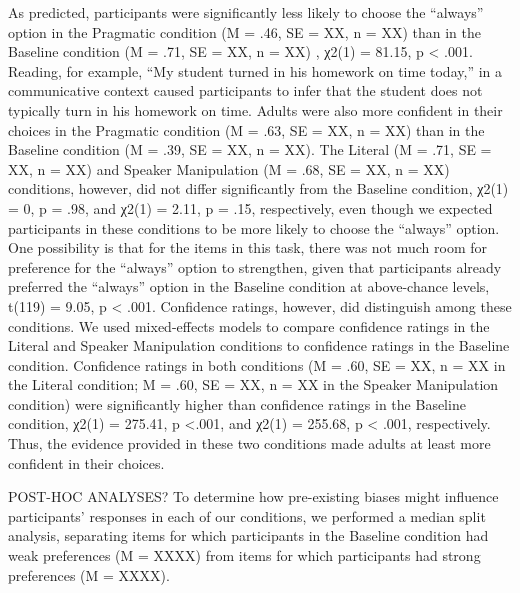 \documentclass[10pt,letterpaper]{article}
\begin{document}
	As predicted, participants were significantly less likely to choose the “always” option in the Pragmatic condition (M = .46, SE = XX, n = XX) than in the Baseline condition (M = .71, SE = XX, n = XX) , χ2(1) = 81.15, p < .001.  Reading, for example, “My student turned in his homework on time today,” in a communicative context caused participants to infer that the student does not typically turn in his homework on time.  Adults were also more confident in their choices in the Pragmatic condition (M = .63, SE = XX, n = XX) than in the Baseline condition (M = .39, SE = XX, n = XX).
The Literal (M = .71, SE = XX, n = XX) and Speaker Manipulation (M = .68,  SE = XX, n = XX) conditions, however, did not differ significantly from the Baseline condition, χ2(1) = 0, p = .98, and χ2(1) = 2.11, p = .15, respectively, even though we expected participants in these conditions to be more likely to choose the “always” option.  One possibility is that for the items in this task, there was not much room for preference for the “always” option to strengthen, given that participants already preferred the “always” option in the Baseline condition at above-chance levels, t(119) = 9.05, p < .001.  Confidence ratings, however, did distinguish among these conditions.  We used mixed-effects models to compare confidence ratings in the Literal and Speaker Manipulation conditions to confidence ratings in the Baseline condition.  Confidence ratings in both conditions (M = .60, SE = XX, n = XX in the Literal condition; M = .60, SE = XX, n = XX in the Speaker Manipulation condition) were significantly higher than confidence ratings in the Baseline condition,  χ2(1) = 275.41, p <.001, and χ2(1) = 255.68, p < .001, respectively.  Thus, the evidence provided in these two conditions made adults at least more confident in their choices.  

POST-HOC ANALYSES?
To determine how pre-existing biases might influence participants’ responses in each of our conditions, we performed a median split analysis, separating items for which participants in the Baseline condition had weak preferences (M  = XXXX) from items for which participants had strong preferences (M = XXXX).  




\setlength{\bibleftmargin}{.125in}
\setlength{\bibindent}{-\bibleftmargin}


\end{document}

